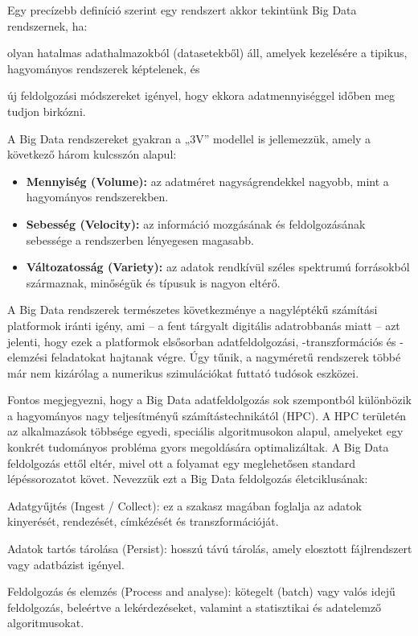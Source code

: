 \documentclass[
]{article}
\providecommand{\tightlist}{%
  \setlength{\itemsep}{0pt}\setlength{\parskip}{0pt}}
\begin{document}
Egy precízebb definíció szerint egy rendszert akkor tekintünk Big Data
rendszernek, ha:

olyan hatalmas adathalmazokból (datasetekből) áll, amelyek kezelésére a
tipikus, hagyományos rendszerek képtelenek, és

új feldolgozási módszereket igényel, hogy ekkora adatmennyiséggel időben
meg tudjon birkózni.

A Big Data rendszereket gyakran a „3V'' modellel is jellemezzük, amely a
következő három kulcsszón alapul:

\begin{itemize}
\tightlist
\item
  \textbf{Mennyiség (Volume):} az adatméret nagyságrendekkel nagyobb,
  mint a hagyományos rendszerekben.
\item
  \textbf{Sebesség (Velocity):} az információ mozgásának és
  feldolgozásának sebessége a rendszerben lényegesen magasabb.
\item
  \textbf{Változatosság (Variety):} az adatok rendkívül széles spektrumú
  forrásokból származnak, minőségük és típusuk is nagyon eltérő.
\end{itemize}

A Big Data rendszerek természetes következménye a nagyléptékű számítási
platformok iránti igény, ami -- a fent tárgyalt digitális adatrobbanás
miatt -- azt jelenti, hogy ezek a platformok elsősorban
adatfeldolgozási, -transzformációs és -elemzési feladatokat hajtanak
végre. Úgy tűnik, a nagyméretű rendszerek többé már nem kizárólag a
numerikus szimulációkat futtató tudósok eszközei.

Fontos megjegyezni, hogy a Big Data adatfeldolgozás sok szempontból
különbözik a hagyományos nagy teljesítményű számítástechnikától (HPC). A
HPC területén az alkalmazások többsége egyedi, speciális algoritmusokon
alapul, amelyeket egy konkrét tudományos probléma gyors megoldására
optimalizáltak. A Big Data feldolgozás ettől eltér, mivel ott a folyamat
egy meglehetősen standard lépéssorozatot követ. Nevezzük ezt a Big Data
feldolgozás életciklusának:

Adatgyűjtés (Ingest / Collect): ez a szakasz magában foglalja az adatok
kinyerését, rendezését, címkézését és transzformációját.

Adatok tartós tárolása (Persist): hosszú távú tárolás, amely elosztott
fájlrendszert vagy adatbázist igényel.

Feldolgozás és elemzés (Process and analyse): kötegelt (batch) vagy
valós idejű feldolgozás, beleértve a lekérdezéseket, valamint a
statisztikai és adatelemző algoritmusokat.
\end{document}

